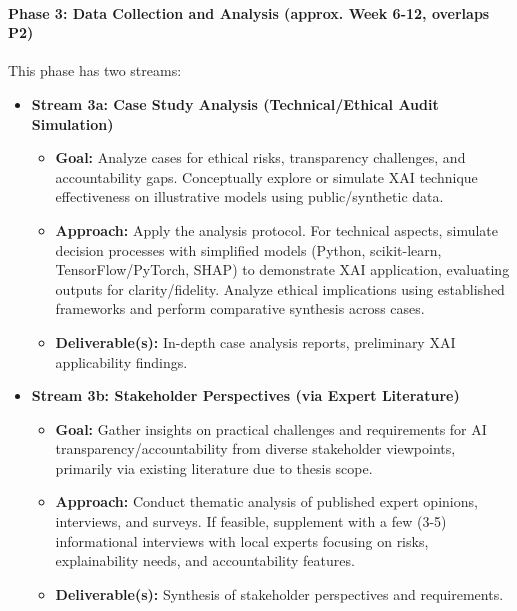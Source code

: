 \documentclass[english]{hogent-article}
\begin{document}
\paragraph{Phase 3: Data Collection and Analysis (approx. Week 6-12, overlaps P2)}
This phase has two streams:
\begin{itemize}
    \item \textbf{Stream 3a: Case Study Analysis (Technical/Ethical Audit Simulation)}
        \begin{itemize}
            \item \textbf{Goal:} Analyze cases for ethical risks, transparency challenges, and accountability gaps. Conceptually explore or simulate XAI technique effectiveness on illustrative models using public/synthetic data.
            \item \textbf{Approach:} Apply the analysis protocol. For technical aspects, simulate decision processes with simplified models (Python, scikit-learn, TensorFlow/PyTorch, SHAP) to demonstrate XAI application, evaluating outputs for clarity/fidelity. Analyze ethical implications using established frameworks and perform comparative synthesis across cases.
            \item \textbf{Deliverable(s):} In-depth case analysis reports, preliminary XAI applicability findings.
        \end{itemize}

    \item \textbf{Stream 3b: Stakeholder Perspectives (via Expert Literature)}
        \begin{itemize}
            \item \textbf{Goal:} Gather insights on practical challenges and requirements for AI transparency/accountability from diverse stakeholder viewpoints, primarily via existing literature due to thesis scope.
            \item \textbf{Approach:} Conduct thematic analysis of published expert opinions, interviews, and surveys. If feasible, supplement with a few (3-5) informational interviews with local experts focusing on risks, explainability needs, and accountability features.
            \item \textbf{Deliverable(s):} Synthesis of stakeholder perspectives and requirements.
        \end{itemize}
\end{itemize}
\newpage
\end{document}
